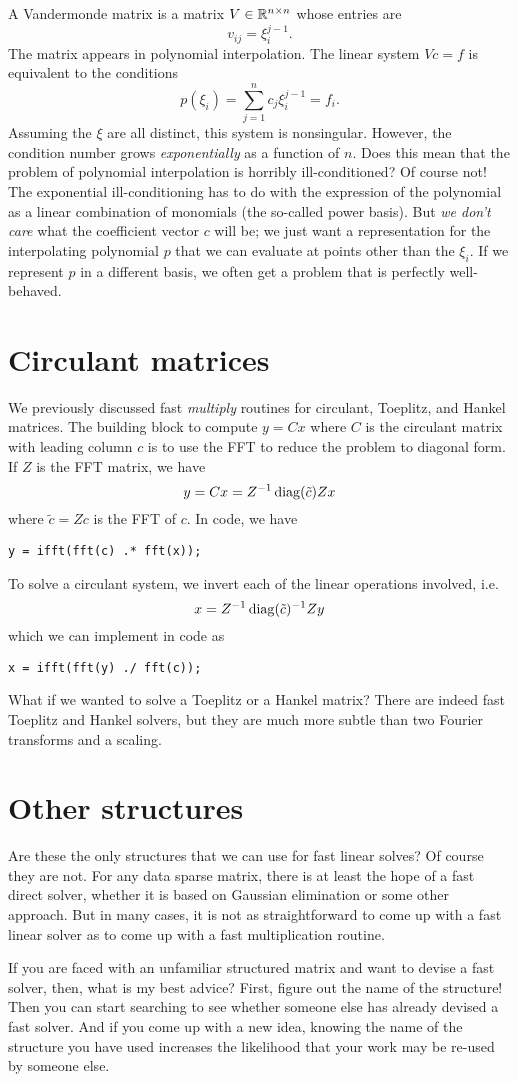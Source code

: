 \documentclass[12pt, leqno]{article} %
\begin{document}
A Vandermonde matrix is a matrix $V \in \mathbb{R}^{n \times n}$
whose entries are
\[
  v_{ij} = \xi_i^{j-1}.
\]
The matrix appears in polynomial interpolation.  The linear
system $Vc = f$ is equivalent to the conditions
\[
  p(\xi_i) = \sum_{j=1}^n c_j \xi_i^{j-1} = f_i.
\]
Assuming the $\xi$ are all distinct, this system is nonsingular.
However, the condition number grows {\em exponentially} as a
function of $n$.  Does this mean that the problem of polynomial
interpolation is horribly ill-conditioned?  Of course not!
The exponential ill-conditioning has to do with the expression
of the polynomial as a linear combination of monomials (the
so-called power basis).   But {\em we don't care} what the coefficient
vector $c$ will be; we just want a representation for the
interpolating polynomial $p$ that we can evaluate at points
other than the $\xi_i$.  If we represent $p$ in a different basis,
we often get a problem that is perfectly well-behaved.

\section{Circulant matrices}

We previously discussed fast {\em multiply} routines for circulant,
Toeplitz, and Hankel matrices.  The building block
to compute $y = Cx$ where $C$ is the circulant matrix with leading
column $c$ is to use the FFT to reduce the problem to diagonal form.
If $Z$ is the FFT matrix, we have
\[
  y = Cx = Z^{-1} \operatorname{diag}(\tilde{c}) Z x
\]
where $\tilde{c} = Zc$ is the FFT of $c$.  In code, we have
\begin{lstlisting}
y = ifft(fft(c) .* fft(x));
\end{lstlisting}
To solve a circulant system, we invert each of the linear operations
involved, i.e.
\[
  x = Z^{-1} \operatorname{diag}(\tilde{c})^{-1} Zy
\]
which we can implement in code as
\begin{lstlisting}
x = ifft(fft(y) ./ fft(c));
\end{lstlisting}
What if we wanted to solve a Toeplitz or a Hankel matrix?  There are
indeed fast Toeplitz and Hankel solvers, but they are much more subtle
than two Fourier transforms and a scaling.

\section{Other structures}

Are these the only structures that we can use for fast linear solves?
Of course they are not.  For any data sparse matrix, there is at least
the hope of a fast direct solver, whether it is based on Gaussian
elimination or some other approach.  But in many cases, it is not
as straightforward to come up with a fast linear solver as to come
up with a fast multiplication routine.

If you are faced with an unfamiliar structured matrix and want to
devise a fast solver, then, what is my best advice?  First, figure
out the name of the structure!  Then you can start searching to see
whether someone else has already devised a fast solver.  And if you
come up with a new idea, knowing the name of the structure you have
used increases the likelihood that your work may be re-used by
someone else. 
\end{document}
